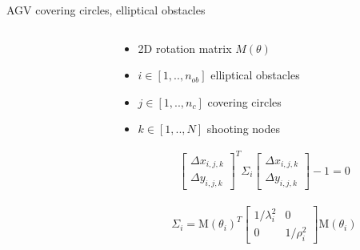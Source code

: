 \documentclass[10pt,aspectratio=1610]{beamer} %
\begin{document}
\begin{frame}{AGV covering circles, elliptical obstacles}
	\begin{columns}[onlytextwidth]
		\begin{column}{0.45\textwidth}
			\begin{center}
			\def\svgwidth{1.1\textwidth}
			
			\end{center}
		\end{column}

		\begin{column}{0.45\textwidth}
		\begin{itemize}[label=\textbullet]
			\item 2D rotation matrix $M(\theta)$
			\item ${i} \in [1, .., n_{ob}]$ elliptical obstacles
			\item ${j} \in [1, .., n_{c}]$ covering circles
			\item ${k} \in [1, .., N]$ shooting nodes
		\end{itemize}
		\begin{align*}
			\begin{bmatrix}
				\Delta x_{i, j, k}\\
				\Delta y_{i, j, k}
			\end{bmatrix}^T
			\Sigma_{i}
			\begin{bmatrix}
				\Delta x_{i, j, k}\\
				\Delta y_{i, j, k}
			\end{bmatrix} - 1 = 0
		\end{align*}
	
		\begin{align*}\Sigma_{i} =
			\mathrm{M}(\theta_{i})^T
				\begin{bmatrix}
					1/\lambda^{2}_{i} & 0\\
					0 & 1/\rho^{2}_{i}
				\end{bmatrix}
				\mathrm{M}(\theta_{i})
		\end{align*}
		\end{column}
	\end{columns}
\end{frame}
\end{document}
